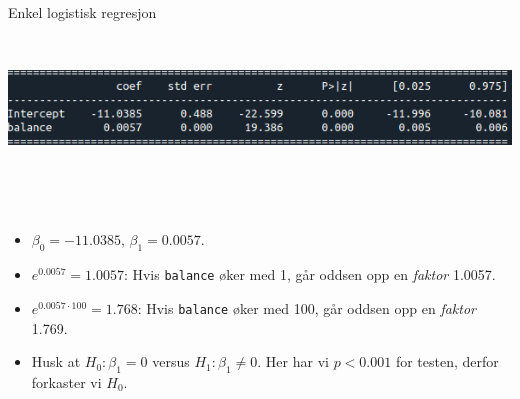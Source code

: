 \documentclass[10pt,ignorenonframetext,]{beamer}
\providecommand{\tightlist}{%
  \setlength{\itemsep}{0pt}\setlength{\parskip}{0pt}}
\begin{document}
\begin{frame}[fragile]

\begin{block}{Enkel logistisk regresjon}

\(~\)

\includegraphics{default_enkelt2.png}

\(~\)

\(~\)

\begin{itemize}
\tightlist
\item
  \(\beta_0=-11.0385\), \(\beta_1=0.0057\).
\end{itemize}

\vspace{3mm}

\begin{itemize}
\tightlist
\item
  \(e^{0.0057}=1.0057\): Hvis \texttt{balance} øker med 1, går oddsen
  opp en \emph{faktor} 1.0057.
\end{itemize}

\vspace{3mm}

\begin{itemize}
\tightlist
\item
  \(e^{0.0057\cdot 100}=1.768\): Hvis \texttt{balance} øker med 100, går
  oddsen opp en \emph{faktor} 1.769.
\end{itemize}

\vspace{3mm}

\begin{itemize}
\tightlist
\item
  Husk at \(H_0: \beta_1=0\) versus \(H_1: \beta_1\neq 0\). Her har vi
  \(p<0.001\) for testen, derfor forkaster vi \(H_0\).
\end{itemize}

\vspace{10mm}

\end{block}

\end{frame}
\end{document}

